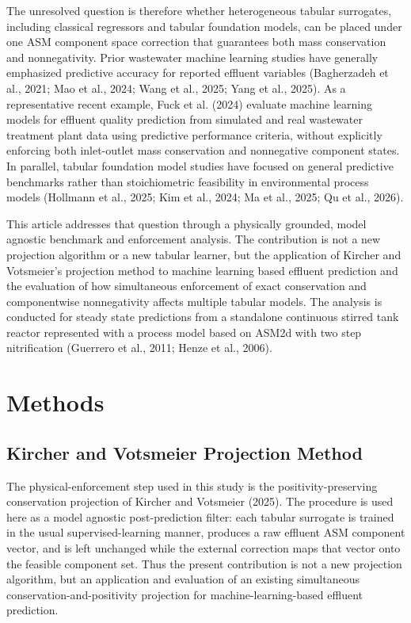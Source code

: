 \documentclass[a4paper,fleqn]{cas-sc}
\begin{document}
The unresolved question is therefore whether heterogeneous tabular surrogates, including classical regressors and tabular foundation models, can be placed under one ASM component space correction that guarantees both mass conservation and nonnegativity. Prior wastewater machine learning studies have generally emphasized predictive accuracy for reported effluent variables (Bagherzadeh et al., 2021; Mao et al., 2024; Wang et al., 2025; Yang et al., 2025). As a representative recent example, Fuck et al. (2024) evaluate machine learning models for effluent quality prediction from simulated and real wastewater treatment plant data using predictive performance criteria, without explicitly enforcing both inlet-outlet mass conservation and nonnegative component states. In parallel, tabular foundation model studies have focused on general predictive benchmarks rather than stoichiometric feasibility in environmental process models (Hollmann et al., 2025; Kim et al., 2024; Ma et al., 2025; Qu et al., 2026).

This article addresses that question through a physically grounded, model agnostic benchmark and enforcement analysis. The contribution is not a new projection algorithm or a new tabular learner, but the application of Kircher and Votsmeier's projection method to machine learning based effluent prediction and the evaluation of how simultaneous enforcement of exact conservation and componentwise nonnegativity affects multiple tabular models. The analysis is conducted for steady state predictions from a standalone continuous stirred tank reactor represented with a process model based on ASM2d with two step nitrification (Guerrero et al., 2011; Henze et al., 2006).

\section{Methods}

\subsection{Kircher and Votsmeier Projection Method}

The physical-enforcement step used in this study is the positivity-preserving conservation projection of Kircher and Votsmeier (2025). The procedure is used here as a model agnostic post-prediction filter: each tabular surrogate is trained in the usual supervised-learning manner, produces a raw effluent ASM component vector, and is left unchanged while the external correction maps that vector onto the feasible component set. Thus the present contribution is not a new projection algorithm, but an application and evaluation of an existing simultaneous conservation-and-positivity projection for machine-learning-based effluent prediction.
\end{document}
